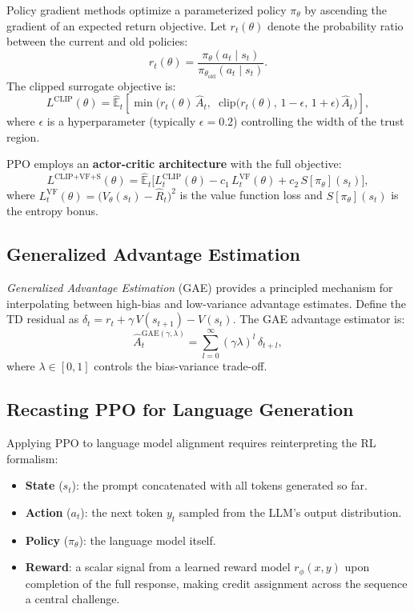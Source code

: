 \documentclass[12pt,a4paper]{report}
\begin{document}
Policy gradient methods optimize a parameterized policy $\pi_\theta$ by ascending the gradient of an expected return objective. Let $r_t(\theta)$ denote the probability ratio between the current and old policies:
\begin{equation}
    r_t(\theta) = \frac{\pi_\theta(a_t \mid s_t)}{\pi_{\theta_{\text{old}}}(a_t \mid s_t)}.
\end{equation}
The clipped surrogate objective is:
\begin{equation}
    \label{eq:ppo_clip}
    L^{\text{CLIP}}(\theta) = \hat{\mathbb{E}}_t \left[ \min\!\Big( r_t(\theta) \, \hat{A}_t, \;\; \text{clip}\!\big(r_t(\theta),\, 1-\epsilon,\, 1+\epsilon\big) \, \hat{A}_t \Big) \right],
\end{equation}
where $\epsilon$ is a hyperparameter (typically $\epsilon = 0.2$) controlling the width of the trust region.

PPO employs an \textbf{actor-critic architecture} with the full objective:
\begin{equation}
    L^{\text{CLIP+VF+S}}(\theta) = \hat{\mathbb{E}}_t \Big[ L_t^{\text{CLIP}}(\theta) - c_1 \, L_t^{\text{VF}}(\theta) + c_2 \, S[\pi_\theta](s_t) \Big],
\end{equation}
where $L_t^{\text{VF}}(\theta) = \big(V_\theta(s_t) - \hat{R}_t\big)^2$ is the value function loss and $S[\pi_\theta](s_t)$ is the entropy bonus.

\subsection{Generalized Advantage Estimation}

\emph{Generalized Advantage Estimation} (GAE) provides a principled mechanism for interpolating between high-bias and low-variance advantage estimates. Define the TD residual as $\delta_t = r_t + \gamma \, V(s_{t+1}) - V(s_t)$. The GAE advantage estimator is:
\begin{equation}
    \label{eq:gae}
    \hat{A}_t^{\text{GAE}(\gamma, \lambda)} = \sum_{l=0}^{\infty} (\gamma \lambda)^l \, \delta_{t+l},
\end{equation}
where $\lambda \in [0,1]$ controls the bias-variance trade-off.

\subsection{Recasting PPO for Language Generation}

Applying PPO to language model alignment requires reinterpreting the RL formalism:
\begin{itemize}
    \item \textbf{State} ($s_t$): the prompt concatenated with all tokens generated so far.
    \item \textbf{Action} ($a_t$): the next token $y_t$ sampled from the LLM's output distribution.
    \item \textbf{Policy} ($\pi_\theta$): the language model itself.
    \item \textbf{Reward}: a scalar signal from a learned reward model $r_\phi(x, y)$ upon completion of the full response, making credit assignment across the sequence a central challenge.
\end{itemize}
\end{document}
